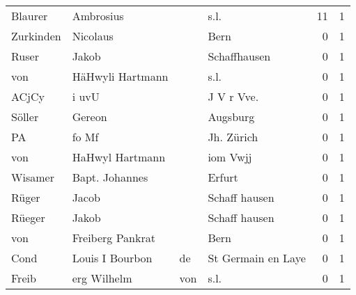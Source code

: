 \begin{tabular}{llllrr}
                  Blaurer &                          Ambrosius &             &                                        s.l. &         11 &         1 \\
                Zurkinden &                           Nicolaus &             &                                        Bern &          0 &         1 \\
                    Ruser &                              Jakob &             &                                Schaffhausen &          0 &         1 \\
                      von &                   HäHwyli Hartmann &             &                                        s.l. &          0 &         1 \\
                    ACjCy &                              i uvU &             &                                 J V r Vve.  &          0 &         1 \\
                   Söller &                             Gereon &             &                                    Augsburg &          0 &         1 \\
                       PA &                              fo Mf &             &                                  Jh. Zürich &          0 &         1 \\
                      von &                    HaHwyl Hartmann &             &                                    iom Vwjj &          0 &         1 \\
                  Wisamer &                     Bapt. Johannes &             &                                      Erfurt &          0 &         1 \\
                    Rüger &                              Jacob &             &                               Schaff hausen &          0 &         1 \\
                   Rüeger &                              Jakob &             &                               Schaff hausen &          0 &         1 \\
                      von &                   Freiberg Pankrat &             &                                        Bern &          0 &         1 \\
                     Cond &                   Louis I  Bourbon &          de &                          St Germain en Laye &          0 &         1 \\
                    Freib &                        erg Wilhelm &         von &                                        s.l. &          0 &         1 \\

\end{tabular}
